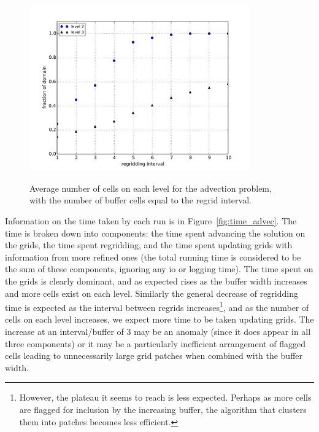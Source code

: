 \documentclass[11pt]{article}
\begin{document}
\begin{figure}[!htb]
\centering
\caption{Average number of cells on each level for the
advection problem, with the number of
buffer cells equal to the regrid interval.}
\includegraphics[width=0.85\textwidth]{myclaw/avg_cells_advec}
\label{fig:avg_cells_advec}
\end{figure}

Information on the time taken by each run is in Figure~\ref{fig:time_advec}.
The time is broken down into components: the time spent advancing the
solution on the grids, the time spent regridding, and the time spent updating
grids with information from more refined ones (the total running time is
considered to be the sum of these components, ignoring any io or logging
time). The time spent on the grids is clearly dominant, and as expected
rises as the buffer width increases and more cells exist on each level.
Similarly the general decrease of regridding time is expected as the interval
between regrids increases\footnote{However, the plateau it seems to reach
is less expected. Perhaps as more cells are flagged for inclusion by the 
increasing buffer, the algorithm that clusters them into patches becomes
less efficient.},
and as the number of cells on each level increases,
we expect more time to be taken updating grids.
The increase at an interval/buffer of 3 may be an anomaly (since it does
appear in all three components) or it may be a particularly inefficient
arrangement of flagged cells leading to unnecessarily large grid patches
when combined with the buffer width.
\end{document}
